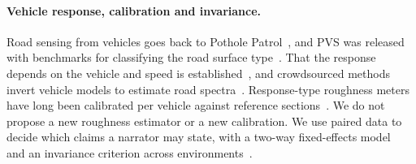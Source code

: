 \paragraph{Vehicle response, calibration and invariance.}
Road sensing from vehicles goes back to Pothole Patrol~\cite{eriksson2008pothole}, and PVS was released with benchmarks for classifying the road surface type~\cite{menegazzo2021pvs}.
That the response depends on the vehicle and speed is established~\cite{dodds1973roughness,gonzalez2008roughness}, and crowdsourced methods invert vehicle models to estimate road spectra~\cite{botshekan2020roughness}.
Response-type roughness meters have long been calibrated per vehicle against reference sections~\cite{sayers1986iri}.
We do not propose a new roughness estimator or a new calibration. We use paired data to decide which claims a narrator may state, with a two-way fixed-effects model~\cite{abowd1999akm} and an invariance criterion across environments~\cite{peters2016icp}.
